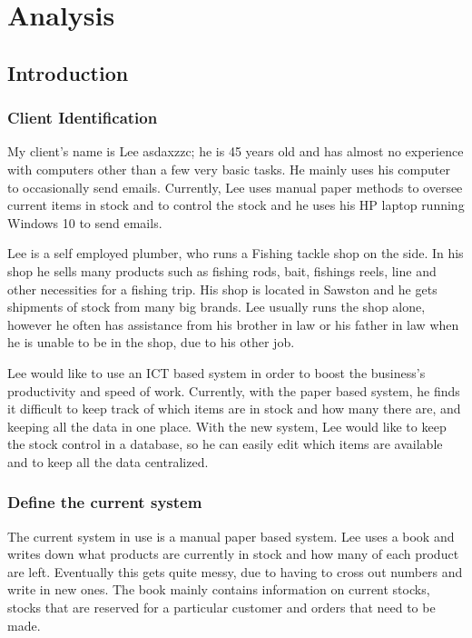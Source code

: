 \chapter{Analysis}

\section{Introduction}

\subsection{Client Identification}
My client's name is Lee asdaxzzc; he is 45 years old and has almost no experience with computers other than a few very basic tasks. He mainly uses his computer to occasionally send emails. Currently, Lee uses manual paper methods to oversee current items in stock and to control the stock and he uses his HP laptop running Windows 10 to send emails.

Lee is a self employed plumber, who runs a Fishing tackle shop on the side. In his shop he sells many products such as fishing rods, bait, fishings reels, line and other necessities for a fishing trip. His shop is located in Sawston and he gets shipments of stock from many big brands. Lee usually runs the shop alone, however he often has assistance from his brother in law or his father in law when he is unable to be in the shop, due to his other job.

Lee would like to use an ICT based system in order to boost the business's productivity and speed of work. Currently, with the paper based system, he finds it difficult to keep track of which items are in stock and how many there are, and keeping all the data in one place. With the new system, Lee would like to keep the stock control in a database, so he can easily edit which items are available and to keep all the data centralized.

\subsection{Define the current system}
The current system in use is a manual paper based system. Lee uses a book and writes down what products are currently in stock and how many of each product are left. Eventually this gets quite messy, due to having to cross out numbers and write in new ones. The book mainly contains information on current stocks, stocks that are reserved for a particular customer and orders that need to be made.

